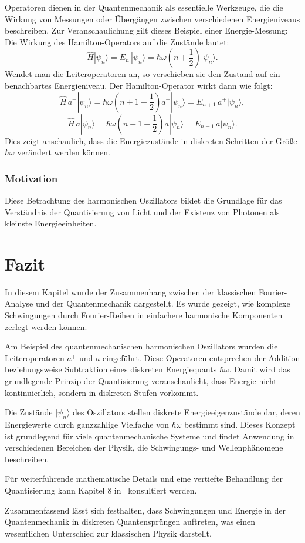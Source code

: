 			Operatoren dienen in der Quantenmechanik als essentielle Werkzeuge, die die Wirkung von Messungen oder Übergängen zwischen verschiedenen Energieniveaus beschreiben.
			Zur Veranschaulichung gilt dieses Beispiel einer Energie-Messung:
			Die Wirkung des Hamilton-Operators auf die Zustände lautet:
			\[
				\hat{H} |\psi_n\rangle = E_n\, |\psi_n\rangle = \hbar\omega\left(n + \frac{1}{2}\right) |\psi_n\rangle.
			\]
			Wendet man die Leiteroperatoren an, so verschieben sie den Zustand auf ein benachbartes Energieniveau.
			Der Hamilton-Operator wirkt dann wie folgt:
			\[
				\hat{H}\, a^+ |\psi_n\rangle = \hbar\omega\left(n + 1 + \frac{1}{2}\right) a^+|\psi_n\rangle = E_{n+1}\, a^+|\psi_n\rangle,
			\]
			\[
				\hat{H}\, a |\psi_n\rangle = \hbar\omega\left(n - 1 + \frac{1}{2}\right) a|\psi_n\rangle = E_{n-1}\, a|\psi_n\rangle.
			\]
			Dies zeigt anschaulich, dass die Energiezustände in diskreten Schritten der Größe \(\hbar\omega\) verändert werden können.

		\subsubsection{Motivation}
			Diese Betrachtung des harmonischen Oszillators bildet die Grundlage für das Verständnis der Quantisierung von Licht und der Existenz von Photonen als kleinste Energieeinheiten.

\section{Fazit\label{fourier:section:fazit}}
	In diesem Kapitel wurde der Zusammenhang zwischen der klassischen Fourier-Analyse und der Quantenmechanik dargestellt.
	Es wurde gezeigt, wie komplexe Schwingungen durch Fourier-Reihen in einfachere harmonische Komponenten zerlegt werden können.

	Am Beispiel des quantenmechanischen harmonischen Oszillators wurden die Leiteroperatoren $a^+$ und $a$ eingeführt.
	Diese Operatoren entsprechen der Addition beziehungsweise Subtraktion eines diskreten Energiequants $\hbar \omega$.
	Damit wird das grundlegende Prinzip der Quantisierung veranschaulicht, dass Energie nicht kontinuierlich, sondern in diskreten Stufen vorkommt.

	Die Zustände $|\psi_n\rangle$ des Oszillators stellen diskrete Energieeigenzustände dar, deren Energiewerte durch ganzzahlige Vielfache von $\hbar \omega$ bestimmt sind.
	Dieses Konzept ist grundlegend für viele quantenmechanische Systeme und findet Anwendung in verschiedenen Bereichen der Physik, die Schwingungs- und Wellenphänomene beschreiben.

	Für weiterführende mathematische Details und eine vertiefte Behandlung der Quantisierung kann Kapitel 8 in~\cite{fourier:quantenmechanik} konsultiert werden.

	Zusammenfassend lässt sich festhalten, dass Schwingungen und Energie in der Quantenmechanik in diskreten Quantensprüngen auftreten, was einen wesentlichen Unterschied zur klassischen Physik darstellt.
